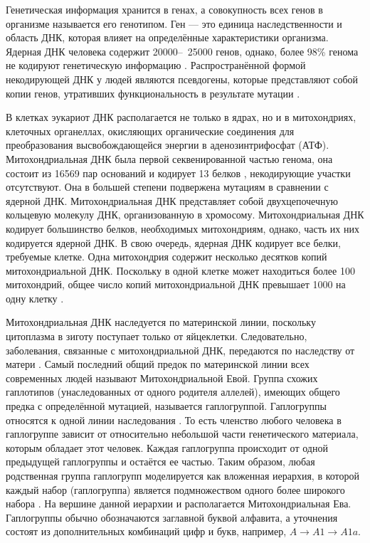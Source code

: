 Генетическая информация хранится в генах, а совокупность всех генов в организме называется его генотипом. Ген --- это единица наследственности и область ДНК, которая влияет на определённые характеристики организма. Ядерная ДНК человека содержит 20000--~25000 генов, однако, более 98\% генома не кодируют генетическую информацию \autocite{Wolfsberg2001}. Распространённой формой некодирующей ДНК у людей являются псевдогены, которые представляют собой копии генов, утративших функциональность в результате мутации \autocite{Harrison2002}.

В клетках эукариот ДНК располагается не только в ядрах, но и в митохондриях, клеточных органеллах, окисляющих органические соединения для преобразования высвобождающейся энергии в аденозинтрифосфат (АТФ). Митохондриальная ДНК была первой секвенированной частью генома, она состоит из 16569 пар оснований и кодирует 13 белков \autocite{Anderson1981}, некодирующие участки отсутствуют. Она в большей степени подвержена мутациям в сравнении с ядерной ДНК. Митохондриальная ДНК представляет собой двухцепочечную кольцевую молекулу ДНК, организованную в хромосому. Митохондриальная ДНК кодирует большинство белков, необходимых митохондриям, однако, часть их них кодируется ядерной ДНК. В свою очередь, ядерная ДНК кодирует все белки, требуемые клетке. Одна митохондрия содержит несколько десятков копий митохондриальной ДНК. Поскольку в одной клетке может находиться более 100 митохондрий, общее число копий митохондриальной ДНК превышает 1000 на одну клетку \autocite{lodish2012molecular}. 

Митохондриальная ДНК наследуется по материнской линии, поскольку цитоплазма в зиготу поступает только от яйцеклетки. Следовательно, заболевания, связанные с митохондриальной ДНК, передаются по наследству от матери \autocite{cooper2004cell}. Самый последний общий предок по материнской линии всех современных людей называют Митохондриальной Евой. Группа схожих гаплотипов (унаследованных от одного родителя аллелей), имеющих общего предка с определённой мутацией, называется гаплогруппой. Гаплогруппы относятся к одной линии наследования \autocite{cox2016biogeography}. То есть членство любого человека в гаплогруппе зависит от относительно небольшой части генетического материала, которым обладает этот человек. Каждая гаплогруппа происходит от одной предыдущей гаплогруппы и остаётся ее частью. Таким образом, любая родственная группа гаплогрупп моделируется как вложенная иерархия, в которой каждый набор (гаплогруппа) является подмножеством одного более широкого набора \autocite{Arora2015}. На вершине данной иерархии и располагается Митохондриальная Ева. Гаплогруппы обычно обозначаются заглавной буквой алфавита, а уточнения состоят из дополнительных комбинаций цифр и букв, например, $A \rightarrow A1 \rightarrow A1a$.


